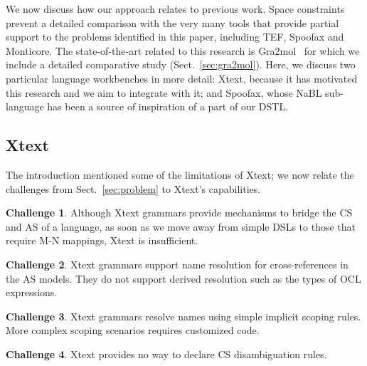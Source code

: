 \documentclass{llncs}
\begin{document}
We now discuss how our approach relates to previous work. Space constraints prevent a detailed comparison with the very many tools that provide partial support to the problems
identified in this paper, including TEF\cite{scheidgen2008tef}, Spoofax\cite{kats2010spoofax} and Monticore\cite{krahn2010monticore}. %
The state-of-the-art related to this research is Gra2mol~\cite{canovas2012gra2mol} for which we include a detailed comparative study (Sect.~\ref{sec:gra2mol}). Here, we discuss two particular language workbenches in more detail: Xtext, because it has motivated this research and we aim to integrate with it; and Spoofax, whose  NaBL\cite{konat2013decNameRes} sub-language has been a source of inspiration of a part of our DSTL. 

\subsection{Xtext}

The introduction mentioned some of the limitations of Xtext; we now relate the challenges from Sect.~\ref{sec:problem} to Xtext's capabilities.

\textbf{Challenge 1}. Although Xtext grammars provide mechanisms to bridge the CS and AS of a language, as soon as we move away from simple DSLs to those that require M-N mappings, Xtext is insufficient.

\textbf{Challenge 2}. Xtext grammars support name resolution for cross-references in the AS models. They do not support derived resolution such as the types of OCL expressions.

\textbf{Challenge 3}. Xtext grammars resolve names using simple implicit scoping rules. More complex scoping scenarios requires customized code.

\textbf{Challenge 4}. Xtext provides no way to declare CS disambiguation rules.

\end{document}
